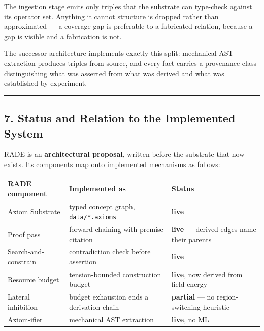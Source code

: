 \documentclass[
  11pt,
  a4paper,
]{article}
\begin{document}
The ingestion stage emits only triples that the substrate can type-check
against its operator set. Anything it cannot structure is dropped rather
than approximated --- a coverage gap is preferable to a fabricated
relation, because a gap is visible and a fabrication is not.

The successor architecture implements exactly this split: mechanical AST
extraction produces triples from source, and every fact carries a
provenance class distinguishing what was asserted from what was derived
and what was established by experiment.

\begin{center}\rule{0.5\linewidth}{0.5pt}\end{center}

\subsection{7. Status and Relation to the Implemented
System}\label{status-and-relation-to-the-implemented-system}

RADE is an \textbf{architectural proposal}, written before the substrate
that now exists. Its components map onto implemented mechanisms as
follows:

\begin{longtable}[]{@{}
  >{\raggedright\arraybackslash}p{}
  >{\raggedright\arraybackslash}p{}
  >{\raggedright\arraybackslash}p{}@{}}
\toprule\noalign{}
\begin{minipage}[b]{\linewidth}\raggedright
RADE component
\end{minipage} & \begin{minipage}[b]{\linewidth}\raggedright
Implemented as
\end{minipage} & \begin{minipage}[b]{\linewidth}\raggedright
Status
\end{minipage} \\
\midrule\noalign{}
\endhead
\bottomrule\noalign{}
\endlastfoot
Axiom Substrate & typed concept graph, \texttt{data/*.axioms} &
\textbf{live} \\
Proof pass & forward chaining with premise citation & \textbf{live} ---
derived edges name their parents \\
Search-and-constrain & contradiction check before assertion &
\textbf{live} \\
Resource budget & tension-bounded construction budget & \textbf{live},
now derived from field energy \\
Lateral inhibition & budget exhaustion ends a derivation chain &
\textbf{partial} --- no region-switching heuristic \\
Axiom-ifier & mechanical AST extraction & \textbf{live}, no ML \\
\end{longtable}
\end{document}
